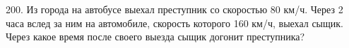 200. Из города на автобусе выехал преступник со скоростью 80 км/ч. Через 2 часа вслед за ним на автомобиле, скорость которого 160 км/ч, выехал сыщик. Через какое время после своего выезда сыщик догонит преступника?\\
